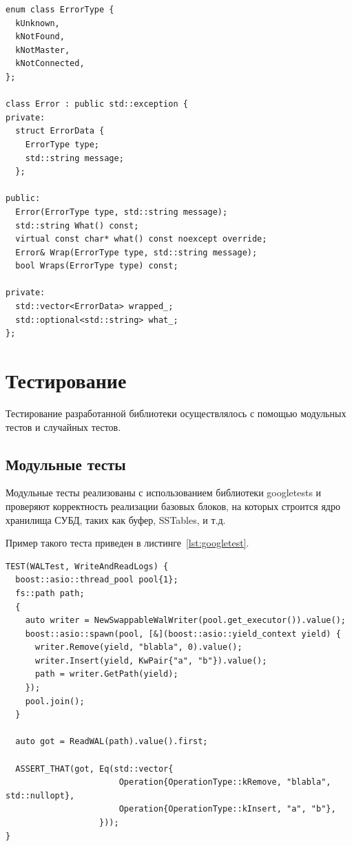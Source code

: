 \documentclass[14pt, russian]{scrartcl}
\begin{document}
\begin{listing}[H]
  \caption{Объявление класса Error.}
  \label{lst:error}
  \begin{verbatim}
enum class ErrorType {
  kUnknown,
  kNotFound,
  kNotMaster,
  kNotConnected,
};

class Error : public std::exception {
private:
  struct ErrorData {
    ErrorType type;
    std::string message;
  };

public:
  Error(ErrorType type, std::string message);
  std::string What() const;
  virtual const char* what() const noexcept override;
  Error& Wrap(ErrorType type, std::string message);
  bool Wraps(ErrorType type) const;

private:
  std::vector<ErrorData> wrapped_;
  std::optional<std::string> what_;
};
  \end{verbatim}
\end{listing}

\section{Тестирование}

Тестирование разработанной библиотеки осуществлялось с помощью модульных тестов и
случайных тестов.

\subsection{Модульные тесты}

Модульные тесты реализованы с использованием библиотеки googletests и проверяют
корректность реализации базовых блоков, на которых строится ядро хранилища СУБД,
таких как буфер, SSTables, и т.д.

Пример такого теста приведен в листинге~\ref{lst:googletest}.

\begin{listing}[H]
  \caption{Тест, проверяющий запись и чтение журнала предзаписи.}
  \label{lst:googletest}
  \begin{verbatim}
TEST(WALTest, WriteAndReadLogs) {
  boost::asio::thread_pool pool{1};
  fs::path path;
  {
    auto writer = NewSwappableWalWriter(pool.get_executor()).value();
    boost::asio::spawn(pool, [&](boost::asio::yield_context yield) {
      writer.Remove(yield, "blabla", 0).value();
      writer.Insert(yield, KwPair{"a", "b"}).value();
      path = writer.GetPath(yield);
    });
    pool.join();
  }

  auto got = ReadWAL(path).value().first;

  ASSERT_THAT(got, Eq(std::vector{
                       Operation{OperationType::kRemove, "blabla", std::nullopt},
                       Operation{OperationType::kInsert, "a", "b"},
                   }));
}
  \end{verbatim}
\end{listing}
\end{document}

